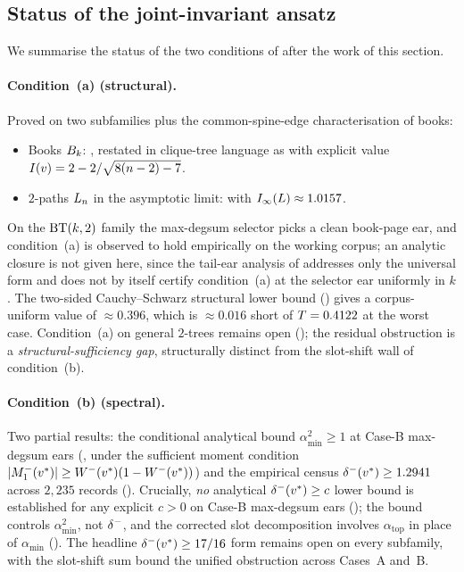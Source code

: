 \subsection{Status of the joint-invariant ansatz}\label{sec:moment-form:status}

We summarise the status of the two conditions of
 after the work of this section.

\paragraph{Condition~(a) (structural).} Proved on two subfamilies
plus the common-spine-edge characterisation of books:
\begin{itemize}
\item Books $B_{k}$: , restated in clique-tree
language as  with explicit value
$I(v) = 2 - 2/\sqrt{8(n-2) - 7}$.
\item $2$-paths $L_{n}$ in the asymptotic limit:
 with $I_{\infty}(L) \approx 1.0157$.
\end{itemize}
On the $\mathrm{BT}(k,2)$ family the max-degsum selector picks a clean
book-page ear, and condition~(a) is observed to hold empirically on
the working corpus; an analytic closure is not given here, since the
tail-ear analysis of  addresses only the
universal form and does not by itself certify condition~(a) at the
selector ear uniformly in $k$.
The two-sided Cauchy--Schwarz structural lower bound
() gives a corpus-uniform value of $\approx 0.396$,
which is $\approx 0.016$ short of $T = 0.4122$ at the worst
case. Condition~(a) on general $2$-trees remains open
(); the residual obstruction is a
\emph{structural-sufficiency gap}, structurally distinct from the
slot-shift wall of condition~(b).

\paragraph{Condition~(b) (spectral).} Two partial results: the
conditional analytical bound $\alpha_{\min}^{2} \ge 1$ at Case-B
max-degsum ears (, under the sufficient moment
condition $|M_{1}^{-}(v^{*})| \ge W^{-}(v^{*})(1 - W^{-}(v^{*}))$) and
the empirical census $\delta^{-}(v^{*}) \ge 1.2941$ across $2{,}235$
records (). Crucially, \emph{no} analytical
$\delta^{-}(v^{*}) \ge c$ lower bound is established for any explicit
$c > 0$ on Case-B max-degsum ears (); the bound
 controls $\alpha_{\min}^{2}$, not $\delta^{-}$,
and the corrected slot decomposition involves $\alpha_{\text{top}}$ in
place of $\alpha_{\min}$ (). The headline
$\delta^{-}(v^{*}) \ge 17/16$ form remains open on every subfamily, with
the slot-shift sum bound  the unified obstruction
across Cases~A and~B.
